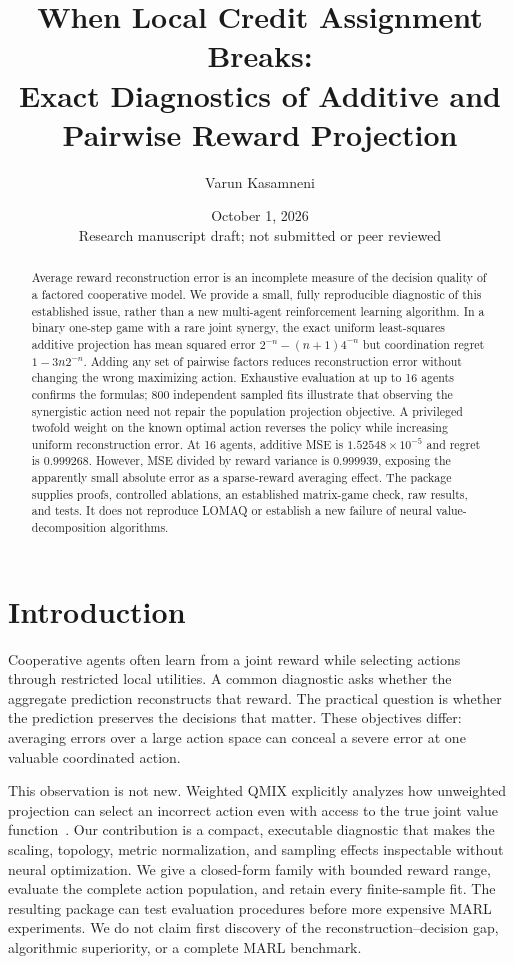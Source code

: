 \documentclass[10pt]{article}
\title{When Local Credit Assignment Breaks:\\Exact Diagnostics of Additive and Pairwise Reward Projection}
\author{Varun Kasamneni}
\date{October 1, 2026\\\small Research manuscript draft; not submitted or peer reviewed}
\begin{document}
\maketitle
\begin{abstract}
Average reward reconstruction error is an incomplete measure of the decision quality of a factored cooperative model. We provide a small, fully reproducible diagnostic of this established issue, rather than a new multi-agent reinforcement learning algorithm. In a binary one-step game with a rare joint synergy, the exact uniform least-squares additive projection has mean squared error $2^{-n}-(n+1)4^{-n}$ but coordination regret $1-3n2^{-n}$. Adding any set of pairwise factors reduces reconstruction error without changing the wrong maximizing action. Exhaustive evaluation at up to 16 agents confirms the formulas; 800 independent sampled fits illustrate that observing the synergistic action need not repair the population projection objective. A privileged twofold weight on the known optimal action reverses the policy while increasing uniform reconstruction error. At 16 agents, additive MSE is $1.52548\times10^{-5}$ and regret is $0.999268$. However, MSE divided by reward variance is $0.999939$, exposing the apparently small absolute error as a sparse-reward averaging effect. The package supplies proofs, controlled ablations, an established matrix-game check, raw results, and tests. It does not reproduce LOMAQ or establish a new failure of neural value-decomposition algorithms.
\end{abstract}

\section{Introduction}
Cooperative agents often learn from a joint reward while selecting actions through restricted local utilities. A common diagnostic asks whether the aggregate prediction reconstructs that reward. The practical question is whether the prediction preserves the decisions that matter. These objectives differ: averaging errors over a large action space can conceal a severe error at one valuable coordinated action.

This observation is not new. Weighted QMIX explicitly analyzes how unweighted projection can select an incorrect action even with access to the true joint value function~\cite{rashid2020weighted}. Our contribution is a compact, executable diagnostic that makes the scaling, topology, metric normalization, and sampling effects inspectable without neural optimization. We give a closed-form family with bounded reward range, evaluate the complete action population, and retain every finite-sample fit. The resulting package can test evaluation procedures before more expensive MARL experiments. We do not claim first discovery of the reconstruction--decision gap, algorithmic superiority, or a complete MARL benchmark.
\end{document}
